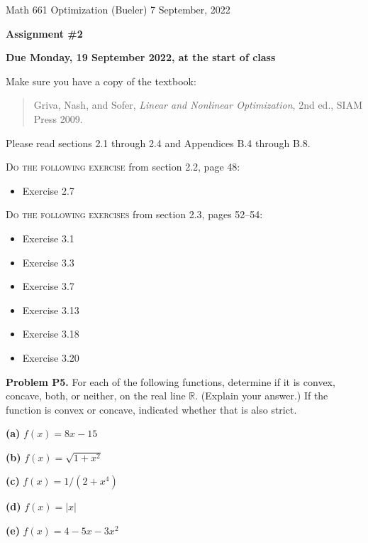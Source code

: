 \documentclass[12pt]{amsart}
\newcommand{\RR}{\mathbb{R}}
\newcommand{\prob}[1]{\bigskip\noindent\textbf{#1}\quad }
\newcommand{\epart}[1]{\medskip\noindent\textbf{(#1)}\quad }
\begin{document}
\scriptsize \noindent Math 661 Optimization (Bueler) \hfill 7 September, 2022
\normalsize

\medskip\bigskip

\Large\centerline{\textbf{Assignment \#2}}
\large
\bigskip

\centerline{\textbf{Due Monday, 19 September 2022, at the start of class}}
\bigskip
\normalsize

\thispagestyle{empty}

\bigskip
\noindent Make sure you have a copy of the textbook:

\begin{quote}
Griva, Nash, and Sofer, \emph{Linear and Nonlinear Optimization}, 2nd ed., SIAM Press 2009.
\end{quote}

\noindent Please read sections 2.1 through 2.4 and Appendices B.4 through B.8.

\bigskip
\noindent \textsc{Do the following exercise} from section 2.2, page 48:

\begin{itemize}
\item Exercise 2.7
\end{itemize}

\bigskip
\noindent \textsc{Do the following exercises} from section 2.3, pages 52--54:

\begin{itemize}
\item Exercise 3.1
\item Exercise 3.3
\item Exercise 3.7
\item Exercise 3.13
\item Exercise 3.18
\item Exercise 3.20
\end{itemize}

\prob{Problem P5.}  For each of the following functions, determine if it is convex, concave, both, or neither, on the real line $\RR$.  (Explain your answer.)  If the function is convex or concave, indicated whether that is also strict.

\epart{a}  $f(x) = 8x - 15$

\epart{b}  $f(x) = \sqrt{1 + x^2}$

\epart{c}  $f(x) = 1 / (2+x^4)$

\epart{d}  $f(x) = |x|$

\epart{e}  $f(x) = 4 - 5 x - 3 x^2$
\end{document}
